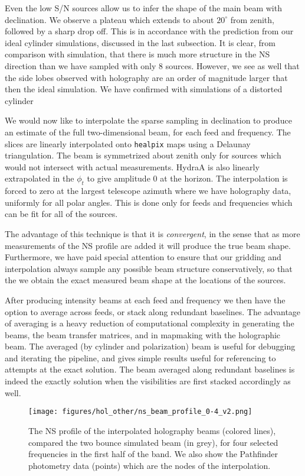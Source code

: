 Even the low S/N sources allow us to infer the shape of the main beam with declination. We observe a plateau which extends to about $20^{\circ}$ from zenith, followed by a sharp drop off. This is in accordance with the prediction from our ideal cylinder simulations, discussed in the last subsection. It is clear, from comparison with simulation, that there is much more structure in the NS direction than we have sampled with only 8 sources. However, we see as well that the side lobes observed with holography are an order of magnitude larger that then the ideal simulation. We have confirmed with simulations of a distorted cylinder 

We would now like to interpolate the sparse sampling in declination to produce an estimate of the full two-dimensional beam, for each feed and frequency. The slices are linearly interpolated onto \texttt{healpix} maps using a Delaunay triangulation. The beam is symmetrized about zenith only for sources which would not intersect with actual measurements. HydraA is also linearly extrapolated in the $\phi_t$ to give amplitude 0 at the horizon. The interpolation is forced to zero at the largest telescope azimuth where we have holography data, uniformly for all polar angles. This is done only for feeds and frequencies which can be fit for all of the sources.

The advantage of this technique is that it is \textit{convergent}, in the sense that as more measurements of the NS profile are added it will produce the true beam shape. Furthermore, we have paid special attention to ensure that our gridding and interpolation always sample any possible beam structure conservatively, so that the we obtain the exact measured beam shape at the locations of the sources.

After producing intensity beams at each feed and frequency we then have the option to average across feeds, or stack along redundant baselines. The advantage of averaging is a heavy reduction of computational complexity in generating the beams, the beam transfer matrices, and in mapmaking with the holographic beam. The averaged (by cylinder and polarization) beam is useful for debugging and iterating the pipeline, and gives simple results useful for referencing to attempts at the exact solution. The beam averaged along redundant baselines is indeed the exactly solution when the visibilities are first stacked accordingly as well.

\begin{figure}[h!]
\begin{center}
\texttt{[image: figures/hol\_other/ns\_beam\_profile\_0-4\_v2.png]}
\caption{The NS profile of the interpolated holography beams (colored lines), compared the two bounce simulated beam (in grey), for four selected frequencies in the first half of the band. We also show the Pathfinder photometry data (points) which are the nodes of the interpolation. \label{nsprof0}}
\end{center}
\end{figure}

